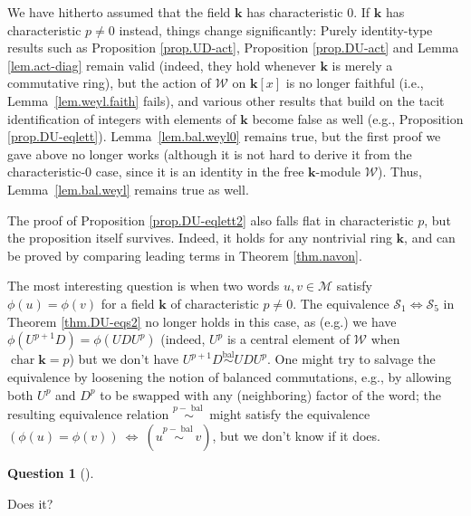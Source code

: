\documentclass[numbers=enddot,12pt,final,onecolumn,notitlepage]{scrartcl}%
\theoremstyle{definition}
\newtheorem{quest}[theo]{Question}
\newenvironment{question}[1][]
{\begin{quest}[#1]\begin{leftbar}}
{\end{leftbar}\end{quest}}
\newcommand{\W}{\mathcal{W}}
\newcommand{\M}{\mathcal{M}}
\newcommand{\kk}{\mathbf{k}}
\newcommand{\charr}{\operatorname{char}}
\newcommand{\balsim}{\overset{\operatorname*{bal}}{\sim}}
\begin{document}
We have hitherto assumed that the field $\kk$ has characteristic $0$. If
$\kk$ has characteristic $p\neq0$ instead, things change significantly:
Purely identity-type results such as Proposition \ref{prop.UD-act},
Proposition \ref{prop.DU-act} and Lemma \ref{lem.act-diag} remain valid
(indeed, they hold whenever $\kk$ is merely a commutative ring), but
the action of $\W$ on $\kk\left[  x\right]  $ is no longer
faithful (i.e., Lemma~\ref{lem.weyl.faith} fails), and various other results
that build on the tacit identification of integers with elements of
$\kk$ become false as well (e.g., Proposition \ref{prop.DU-eqlett}).
Lemma~\ref{lem.bal.weyl0} remains true, but the first proof we gave above no longer
works (although it is not hard to derive it from the characteristic-$0$ case,
since it is an identity in the free $\kk$-module $\W$).
Thus, Lemma~\ref{lem.bal.weyl} remains true as well.

The proof of Proposition \ref{prop.DU-eqlett2} also falls flat in
characteristic $p$, but the proposition itself survives. Indeed, it holds for
any nontrivial ring $\kk$, and can be proved by comparing leading terms
in Theorem \ref{thm.navon}.

The most interesting question is when two words $u,v\in\M$ satisfy
$\phi\left(  u\right)  =\phi\left(  v\right)  $ for a field $\kk$ of
characteristic $p\neq0$. The equivalence $\mathcal{S}_{1}\Longleftrightarrow
\mathcal{S}_{5}$ in Theorem \ref{thm.DU-eqs2} no longer holds in this case, as
(e.g.) we have $\phi\left(  U^{p+1}D\right)  =\phi\left(  UDU^{p}\right)  $
(indeed, $U^{p}$ is a central element of $\W$ when
$\charr \kk = p$) but we don't have $U^{p+1} D \balsim UDU^{p}$.
One might try to salvage the
equivalence by loosening the notion of balanced commutations, e.g., by
allowing both $U^{p}$ and $D^{p}$ to be swapped with any (neighboring) factor
of the word; the resulting equivalence relation
$\overset{p-\operatorname*{bal}}{\sim}$ might satisfy the equivalence $\left(
\phi\left(  u\right)  =\phi\left(  v\right)  \right)  \ \Longleftrightarrow
\ \left(  u\overset{p-\operatorname*{bal}}{\sim}v\right)  $, but we don't know
if it does.

\begin{question}
Does it?
\end{question}

\end{document}
